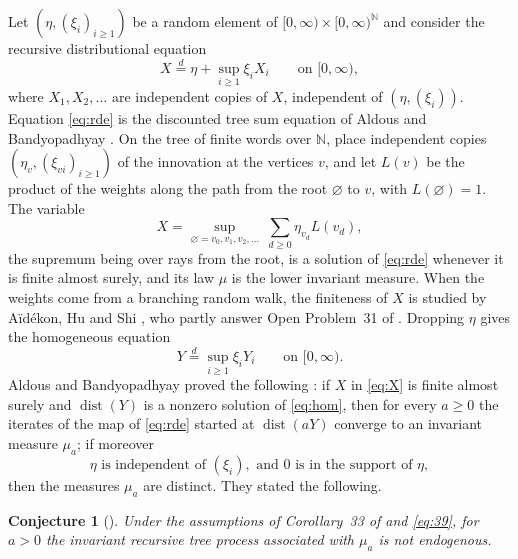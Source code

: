 \documentclass[11pt]{amsart}
\newtheorem{conjecture}[theorem]{Conjecture}
\theoremstyle{remark}
\newcommand{\N}{\mathbb{N}}
\newcommand{\dist}{\operatorname{dist}}
\begin{document}
Let $(\eta,(\xi_i)_{i\ge 1})$ be a random element of $[0,\infty)\times[0,\infty)^{\N}$ and
consider the recursive distributional equation
\begin{equation}\label{eq:rde}
X\stackrel{d}{=}\eta+\sup_{i\ge 1}\xi_i X_i \qquad\text{on } [0,\infty),
\end{equation}
where $X_1,X_2,\dots$ are independent copies of $X$, independent of $(\eta,(\xi_i))$.
Equation \eqref{eq:rde} is the discounted tree sum equation of Aldous and Bandyopadhyay
\cite[Section~4.4]{AB}. On the tree of finite words over $\N$, place independent copies
$(\eta_v,(\xi_{vi})_{i\ge1})$ of the innovation at the vertices $v$, and let $L(v)$ be the
product of the weights along the path from the root $\varnothing$ to $v$, with
$L(\varnothing)=1$. The variable
\begin{equation}\label{eq:X}
X=\sup_{\varnothing=v_0,v_1,v_2,\dots}\ \sum_{d\ge 0}\eta_{v_d}L(v_d),
\end{equation}
the supremum being over rays from the root, is a solution of \eqref{eq:rde} whenever it is
finite almost surely, and its law $\mu$ is the lower invariant measure. When the weights come from a
branching random walk, the finiteness of $X$ is studied by A\"id\'ekon, Hu and Shi \cite{AHS},
who partly answer Open Problem~31 of \cite{AB}. Dropping $\eta$
gives the homogeneous equation
\begin{equation}\label{eq:hom}
Y\stackrel{d}{=}\sup_{i\ge 1}\xi_i Y_i\qquad\text{on } [0,\infty).
\end{equation}
Aldous and Bandyopadhyay proved the following \cite[Corollary~33]{AB}: if $X$ in
\eqref{eq:X} is finite almost surely and $\dist(Y)$ is a nonzero solution of
\eqref{eq:hom}, then for every $a\ge 0$ the iterates of the map of \eqref{eq:rde} started
at $\dist(aY)$ converge to an invariant measure $\mu_a$; if moreover
\begin{equation}\label{eq:39}
\eta \text{ is independent of } (\xi_i), \text{ and } 0 \text{ is in the support of } \eta,
\end{equation}
then the measures $\mu_a$ are distinct. They stated the following.

\begin{conjecture}[{\cite[Conjecture~34]{AB}}]\label{conj}
Under the assumptions of Corollary~33 of \cite{AB} and \eqref{eq:39}, for $a>0$ the
invariant recursive tree process associated with $\mu_a$ is not endogenous.
\end{conjecture}
\end{document}
